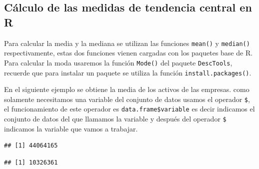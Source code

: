 \documentclass[]{book}
\newenvironment{Shaded}{\begin{snugshade}}{\end{snugshade}}
\newcommand{\KeywordTok}[1]{\textcolor[rgb]{0.13,0.29,0.53}{\textbf{#1}}}
\newcommand{\NormalTok}[1]{#1}
\newcommand{\OperatorTok}[1]{\textcolor[rgb]{0.81,0.36,0.00}{\textbf{#1}}}
\begin{document}
\hypertarget{calculo-de-las-medidas-de-tendencia-central-en-r}{%
\subsection{Cálculo de las medidas de tendencia central en R}\label{calculo-de-las-medidas-de-tendencia-central-en-r}}

Para calcular la media y la mediana se utilizan las funciones \texttt{mean()} y \texttt{median()} respectivamente, estas dos funciones vienen cargadas con los paquetes base de R. Para calcular la moda usaremos la función \texttt{Mode()} del paquete \texttt{DescTools}, recuerde que para instalar un paquete se utiliza la función \texttt{install.packages()}.

En el siguiente ejemplo se obtiene la media de los activos de las empresas. como solamente necesitamos una variable del conjunto de datos usamos el operador \texttt{\$}, el funcionamiento de este operador es \texttt{data.frame\$variable} es decir indicamos el conjunto de datos del que llamamos la variable y después del operador \texttt{\$} indicamos la variable que vamos a trabajar.

\begin{Shaded}
\end{Shaded}

\begin{verbatim}
## [1] 44064165
\end{verbatim}

\begin{Shaded}
\end{Shaded}

\begin{verbatim}
## [1] 10326361
\end{verbatim}

\begin{Shaded}
\end{Shaded}
\end{document}
